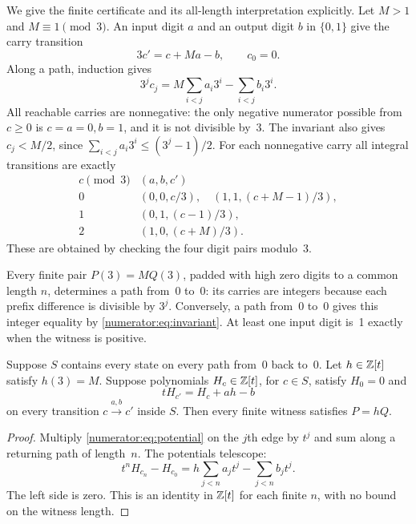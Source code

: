 We give the finite certificate and its all-length interpretation
explicitly. Let $M>1$ and $M\equiv1\pmod3$. An input digit $a$ and an
output digit $b$ in $\{0,1\}$ give the carry transition
\begin{equation}\label{numerator:eq:carry}
 3c'=c+Ma-b,\qquad c_0=0.
\end{equation}
Along a path, induction gives
\begin{equation}\label{numerator:eq:invariant}
 3^j c_j=M\sum_{i<j}a_i3^i-\sum_{i<j}b_i3^i.
\end{equation}
All reachable carries are nonnegative: the only negative numerator
possible from $c\ge0$ is $c=a=0,b=1$, and it is not divisible by~3.
The invariant also gives $c_j<M/2$, since
$\sum_{i<j}a_i3^i\le(3^j-1)/2$.
For each nonnegative carry all integral transitions are exactly
\begin{equation}\label{numerator:eq:all-edges}
\begin{array}{c|l}
 c\pmod3 & (a,b,c')\\\hline
 0 &(0,0,c/3),\quad(1,1,(c+M-1)/3),\\
 1 &(0,1,(c-1)/3),\\
 2 &(1,0,(c+M)/3).
\end{array}
\end{equation}
These are obtained by checking the four digit pairs modulo~3.

Every finite pair $P(3)=M Q(3)$, padded with high zero digits to a
common length $n$, determines a path from~0 to~0: its carries are
integers because each prefix difference is divisible by $3^j$.
Conversely, a path from~0 to~0 gives this integer equality by
\eqref{numerator:eq:invariant}. At least one input digit is~1 exactly
when the witness is positive.

\begin{lemma}
\label{numerator:potential}
Suppose $S$ contains every state on every path from~0 back to~0.
Let $h\in\mathbb Z[t]$ satisfy $h(3)=M$. Suppose polynomials
$H_c\in\mathbb Z[t]$, for $c\in S$, satisfy $H_0=0$ and
\begin{equation}\label{numerator:eq:potential}
 tH_{c'}=H_c+a h-b
\end{equation}
on every transition $c\xrightarrow{a,b}c'$ inside $S$.
Then every finite witness satisfies $P=hQ$.
\end{lemma}
\begin{proof}
Multiply \eqref{numerator:eq:potential} on the $j$th edge by $t^j$
and sum along a returning path of length~$n$. The potentials telescope:
\[
 t^nH_{c_n}-H_{c_0}
   =h\sum_{j<n}a_jt^j-\sum_{j<n}b_jt^j.
\]
The left side is zero. This is an identity in $\mathbb Z[t]$ for each finite
$n$, with no bound on the witness length.
\end{proof}

